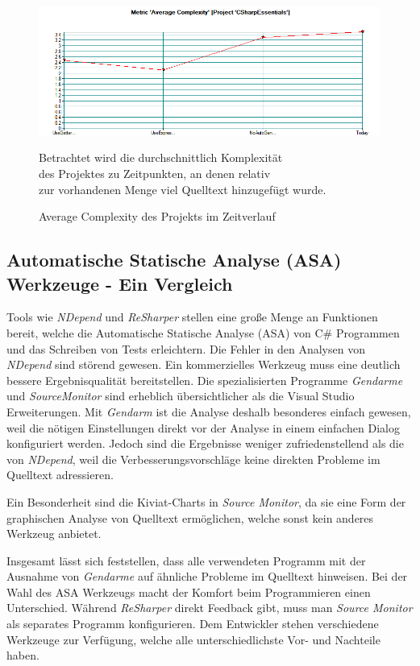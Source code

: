 \begin{figure}[!ht]
	\centering
	\includegraphics[width=\textwidth]{images/source-monitor-avg-complexity-over-time.png}
	\caption{Average Complexity des Projekts im Zeitverlauf}
	\vspace{0.1cm}
	Betrachtet wird die durchschnittlich Komplexität \\ des Projektes zu Zeitpunkten, an denen relativ \\ zur vorhandenen Menge viel Quelltext hinzugefügt wurde.
	\label{fig:source-monitor-time-metric-chart}
\end{figure}

\newpage

\subsection{Automatische Statische Analyse (ASA) Werkzeuge - Ein Vergleich}
Tools wie \emph{NDepend} und \emph{ReSharper} stellen eine große Menge an Funktionen bereit, welche die Automatische Statische Analyse (ASA) von C\# Programmen und das Schreiben von Tests erleichtern. Die Fehler in den Analysen von \emph{NDepend} sind störend gewesen. Ein kommerzielles Werkzeug muss eine deutlich bessere Ergebnisqualität bereitstellen. Die spezialisierten Programme \emph{Gendarme} und \emph{SourceMonitor} sind erheblich übersichtlicher als die Visual Studio Erweiterungen. Mit \emph{Gendarm} ist die Analyse deshalb besonderes einfach gewesen, weil die nötigen Einstellungen direkt vor der Analyse in einem einfachen Dialog konfiguriert werden. Jedoch sind die Ergebnisse weniger zufriedenstellend als die von \emph{NDepend}, weil die Verbesserungsvorschläge keine direkten Probleme im Quelltext adressieren.

Ein Besonderheit sind die Kiviat-Charts in \emph{Source Monitor}, da sie eine Form der graphischen Analyse von Quelltext ermöglichen, welche sonst kein anderes Werkzeug anbietet.

Insgesamt lässt sich feststellen, dass alle verwendeten Programm mit der Ausnahme von \emph{Gendarme} auf ähnliche Probleme im Quelltext hinweisen. Bei der Wahl des ASA Werkzeugs macht der Komfort beim Programmieren einen Unterschied. Während \emph{ReSharper} direkt Feedback gibt, muss man \emph{Source Monitor} als separates Programm konfigurieren. Dem Entwickler stehen verschiedene Werkzeuge zur Verfügung, welche alle unterschiedlichste Vor- und Nachteile haben.

